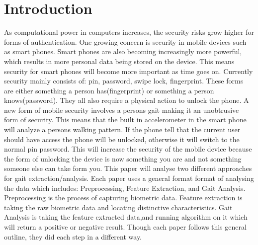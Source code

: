 \documentclass{sig-alternate}
\begin{document}
\section{Introduction}
	As computational power in computers increases, the security risks grow higher for forms of authentication. One growing concern is security in mobile devices such as smart phones. Smart phones are also becoming increasingly more powerful, which results in more personal data being stored on the device. This means security for smart phones will become more important as time goes on. Currently security mainly consists of: pin, password, swipe lock, fingerprint. These forms are either something a person has(fingerprint) or something a person knows(password). They all also require a physical action to unlock the phone. A new form of mobile security involves a persons gait making it an unobtrusive form of security. This means that the built in accelerometer in the smart phone will analyze a persons walking pattern. If the phone tell that the current user should have access the phone will be unlocked, otherwise it will switch to the normal pin password. This will increase the security of the mobile device because the form of unlocking the device is now something you are and not something someone else can take form you. 
	This paper will analyse two different approaches for gait extraction/analysis. Each paper uses a general format format of analysing the data which includes: Preprocessing, Feature Extraction, and Gait Analysis. Preprocessing is the process of capturing biometric data. Feature extraction is taking the raw biometric data and locating distinctive characteristics. Gait Analysis is taking the feature extracted data,and running algorithm on it which will return a positive or negative result. Though each paper follows this general outline, they did each step in a different way.


\end{document}
